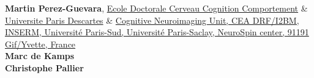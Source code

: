\textbf{Martin Perez-Guevara}, \href{http://ed3c.upmc.fr/}{Ecole Doctorale Cerveau Cognition Comportement} \& \href{http://www.parisdescartes.fr/}{Universite Paris Descartes} \& \href{www.unicog.org}{Cognitive Neuroimaging Unit, CEA DRF/I2BM, INSERM, Université Paris-Sud, Université Paris-Saclay, NeuroSpin center, 91191 Gif/Yvette, France}\\ \textbf{Marc de Kamps}\\ \textbf{Christophe Pallier}\\

